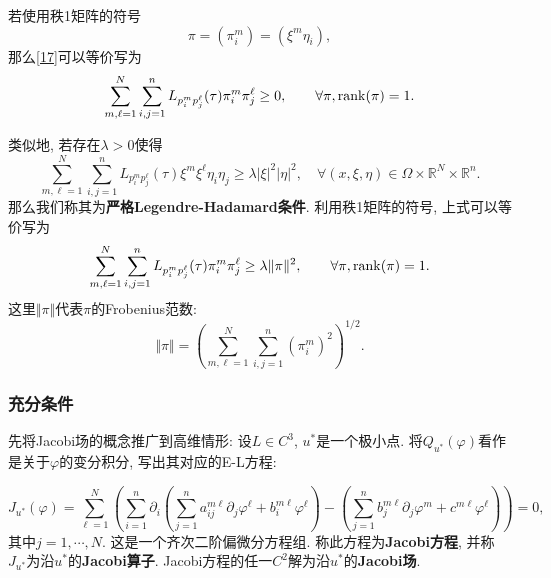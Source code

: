 \begin{remark}
    若使用秩1矩阵的符号
\begin{equation*}
    \pi = (\pi_i^m) = (\xi^m\eta_i), 
\end{equation*}
那么\eqref{17}可以等价写为 
\begin{equation*}
    \sum_{m, \ell = 1}^N\sum_{i, j = 1}^nL_{p_i^mp_j^\ell}(\tau)\pi_i^m\pi_j^\ell \geq 0, \qquad \forall \pi, {\rm rank}(\pi) = 1.
\end{equation*}
\end{remark}

类似地, 若存在$\lambda > 0$使得 
\begin{equation*}
    \boxed{\sum_{m, \ell = 1}^N\sum_{i, j = 1}^nL_{p_i^mp_j^\ell}(\tau)\xi^m\xi^\ell\eta_i\eta_j \geq \lambda|\xi|^2|\eta|^2, \quad \forall (x, \xi, \eta) \in \Omega \times \mathbb{R}^N \times \mathbb{R}^n.}
\end{equation*}
那么我们称其为\textbf{严格Legendre-Hadamard条件}. 利用秩1矩阵的符号, 上式可以等价写为 
\begin{equation*}
    \sum_{m, \ell = 1}^N\sum_{i, j = 1}^nL_{p_i^mp_j^\ell}(\tau)\pi_i^m\pi_j^\ell \geq \lambda\Vert \pi\Vert^2, \qquad \forall \pi, {\rm rank}(\pi) = 1. 
\end{equation*}
这里$\Vert \pi\Vert$代表$\pi$的Frobenius范数:
\begin{equation*}
    \Vert \pi \Vert = \left(\sum_{m, \ell = 1}^N\sum_{i, j = 1}^n(\pi_i^m)^2\right)^{1/2}.
\end{equation*}

\subsubsection{充分条件}

先将Jacobi场的概念推广到高维情形: 设$L \in C^3$, $u^*$是一个极小点. 将$Q_{u^*}(\varphi)$看作是关于$\varphi$的变分积分, 写出其对应的E-L方程:

\begin{equation*}
    \boxed{J_{u^*}(\varphi) = \sum_{\ell = 1}^N\left(\sum_{i = 1}^n\partial_i\left(\sum_{j = 1}^na_{ij}^{m\ell}\partial_j\varphi^\ell + b_i^{m\ell}\varphi^\ell\right) - \left(\sum_{j = 1}^nb_j^{m\ell}\partial_j\varphi^m + c^{m\ell}\varphi^\ell\right)\right) = 0,}
\end{equation*}
其中$j = 1, \cdots, N$. 这是一个齐次二阶偏微分方程组. 称此方程为\textbf{Jacobi方程}, 并称$J_{u^*}$为沿$u^*$的\textbf{Jacobi算子}.
Jacobi方程的任一$C^2$解为沿$u^*$的\textbf{Jacobi场}.

